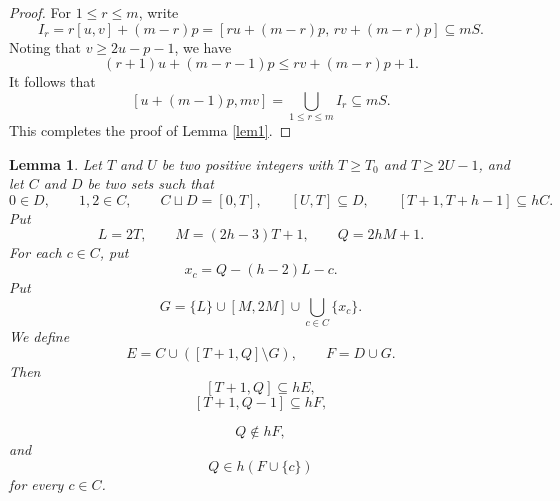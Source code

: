 \documentclass[reqno,12pt,twoside]{article}
\numberwithin{equation}{section}
\newtheorem{lemma}[theorem]{Lemma}
\begin{document}
\begin{proof}
For $1\le r\le m$, write
\[
 I_r=r[u,v]+(m-r)p
   =[ru+(m-r)p,\,rv+(m-r)p]\subseteq mS.
\]
Noting that $v\ge 2u-p-1$, we have
\[
 (r+1)u+(m-r-1)p\le rv+(m-r)p+1.
\]
It follows that
\[
 [u+(m-1)p,mv]=\bigcup_{1\le r\le m} I_r\subseteq mS.
\]
This completes the proof of Lemma \ref{lem1}.
\end{proof}

\begin{lemma}\label{lem2}
Let $T$ and $U$ be two positive integers with $T\ge T_0$ and $T\ge2U-1$, and let $C$ and $D$ be two sets such that
\[
 0\in D,\qquad 1,2\in C,\qquad C\sqcup D=[0,T],\qquad [U,T]\subseteq D,\qquad
 [T+1,T+h-1]\subseteq hC.
\]
Put
\[
 L=2T,\qquad M=(2h-3)T+1,\qquad Q=2hM+1.
\]
For each $c\in C$, put
\[
 x_c=Q-(h-2)L-c.
\]
Put
\[
 G=\{L\}\cup[M,2M]\cup\bigcup_{c\in C}\{x_c\}.
\]
We define
\[
 E=C\cup([T+1,Q]\setminus G),\qquad F=D\cup G.
\]
Then
\begin{equation}\label{eq1}
[T+1,Q]\subseteq hE,
\end{equation}
\begin{equation}\label{eq2}
[T+1,Q-1]\subseteq hF,
\end{equation}

\begin{equation}\label{eq3}
Q\notin hF,
\end{equation}
and
\begin{equation}\label{eq4}
Q\in h(F\cup\{c\})
\end{equation}
for every $c\in C$.
\end{lemma}
\end{document}
